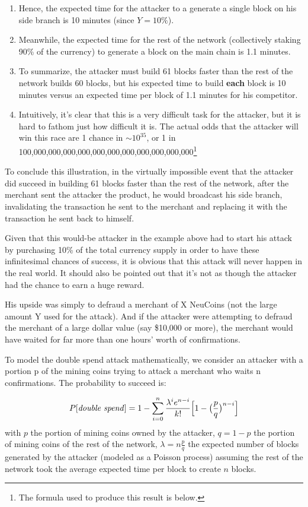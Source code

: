 \documentclass[a4paper,11pt]{article}
\begin{document}
\begin{enumerate}
{\begin{enumerate}
	\item{Hence, the expected time for the attacker to a generate a single block on his side branch is 10 minutes (since $Y = 10\%$).}
	\item{Meanwhile, the expected time for the rest of the network (collectively staking 90\% of the currency) to generate a block on the main chain is 1.1 minutes.}
	\item{To summarize, the attacker must build 61 blocks faster than the rest of the network builds 60 blocks, but his expected time to build \textbf{each} block is 10 minutes versus an expected time per block of 1.1 minutes for his competitor.}
	\item{Intuitively, it's clear that this is a very difficult task for the attacker, but it is hard to fathom just how difficult it is. The actual odds that the attacker will win this race are 1 chance in $\sim10^{35}$, or 1 in 100,000,000,000,000,000,000,000,000,000,000,000\footnote{The formula used to produce this result is below.} 
}
	\end{enumerate}
\item{To conclude this illustration, in the virtually impossible event that the attacker did succeed in building 61 blocks faster than the rest of the network, after the merchant sent the attacker the product, he would broadcast his side branch, invalidating the transaction he sent to the merchant and replacing it with the transaction he sent back to himself.}
}
\end{enumerate}
  
Given that this would-be attacker in the example above had to start his attack by purchasing 10\% of the total currency supply in order to have these infinitesimal chances of success, it is obvious that this attack will never happen in the real world. It should also be pointed out that it's not as though the attacker had the chance to earn a huge reward. 

His upside was simply to defraud a merchant of X NeuCoins (not the large amount Y used for the attack). And if the attacker were attempting to defraud the merchant of a large dollar value (say \$10,000 or more), the merchant would have waited for far more than one hours' worth of confirmations.


To model the double spend attack mathematically\cite{nakamoto2008bitcoin}, we consider an attacker with a portion p of the mining coins trying to attack a merchant who waits n confirmations. The probability to succeed is:

 
$$ P[\text{\textit{double spend}}]= 1 - \sum\limits_{i=0}^n\frac{\lambda^{i}e^{n-i}}{k!} \Big[ 1- \big(\frac{p}{q}\big)^{n-i} \Big] $$
with $p$ the portion of mining coins owned by the attacker, $q=1-p$ the portion of mining coins of the rest of the network, $\lambda=n\frac{p}{q}$ the expected number of blocks generated by the attacker (modeled as a Poisson process) assuming the rest of the network took the average expected time per block to create $n$ blocks.
\end{document}
